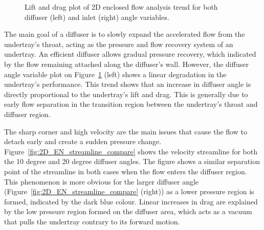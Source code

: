 \begin{figure}[!ht]
  \noindent
  \caption{Lift and drag plot of 2D enclosed flow analysis trend for both diffuser (left) and inlet (right) angle variables.}
  \label{fig:2D_EN_result}
\end{figure}

\noindent The main goal of a diffuser is to slowly expand the accelerated flow from the undertray's throat, acting as the pressure and flow recovery system of an undertray. An efficient diffuser allows gradual pressure recovery, which indicated by the flow remaining attached along the diffuser's wall. However, the diffuser angle variable plot on Figure~\ref{fig:2D_EN_result} (left) shows a linear degradation in the undertray's performance. This trend shows that an increase in diffuser angle is directly proportional to the undertray's lift and drag. This is generally due to early flow separation in the transition region between the undertray's throat and diffuser region. 

\noindent The sharp corner and high velocity are the main issues that cause the flow to detach early and create a sudden pressure change. Figure~\ref{fig:2D_EN_streamline_compare} shows the velocity streamline for both the 10 degree and 20 degree diffuser angles. The figure shows a similar separation point of the streamline in both cases when the flow enters the diffuser region. This phenomenon is more obvious for the larger diffuser angle (Figure~\ref{fig:2D_EN_streamline_compare} (right)) as a lower pressure region is formed, indicated by the dark blue colour. Linear increases in drag are explained by the low pressure region formed on the diffuser area, which acts as a vacuum that pulls the undertray contrary to its forward motion.  

